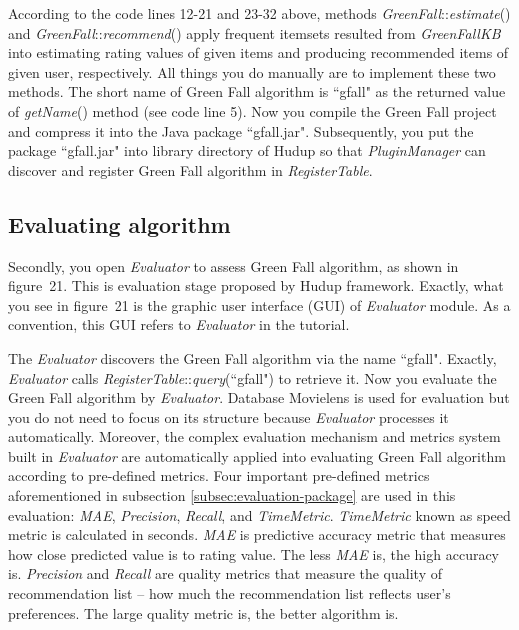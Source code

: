 \documentclass[a4paper]{llncs}
\begin{document}
According to the code lines 12-21 and 23-32 above, methods \textit{GreenFall}::\textit{estimate}() and \textit{GreenFall}::\textit{recommend}() apply frequent itemsets resulted from \textit{GreenFallKB} into estimating rating values of given items and producing recommended items of given user, respectively. All things you do manually are to implement these two methods. The short name of Green Fall algorithm is ``gfall" as the returned value of \textit{getName}() method (see code line 5). Now you compile the Green Fall project and compress it into the Java package ``gfall.jar". Subsequently, you put the package ``gfall.jar" into library directory of Hudup so that \textit{PluginManager} can discover and register Green Fall algorithm in \textit{RegisterTable}.

\subsection{Evaluating algorithm}
\label{subsec:tutorial-evaluating}
Secondly, you open \textit{Evaluator} to assess Green Fall algorithm, as shown in figure~21. This is evaluation stage proposed by Hudup framework. Exactly, what you see in figure~21 is the graphic user interface (GUI) of \textit{Evaluator} module. As a convention, this GUI refers to \textit{Evaluator} in the tutorial.

The \textit{Evaluator} discovers the Green Fall algorithm via the name ``gfall". Exactly, \textit{Evaluator} calls \textit{RegisterTable}::\textit{query}(``gfall") to retrieve it. Now you evaluate the Green Fall algorithm by \textit{Evaluator}. Database Movielens \cite{movielens} is used for evaluation but you do not need to focus on its structure because \textit{Evaluator} processes it automatically. Moreover, the complex evaluation mechanism and metrics system built in \textit{Evaluator} are automatically applied into evaluating Green Fall algorithm according to pre-defined metrics. Four important pre-defined metrics aforementioned in subsection \ref{subsec:evaluation-package} are used in this evaluation: \textit{MAE}, \textit{Precision}, \textit{Recall}, and \textit{TimeMetric}. \textit{TimeMetric} known as speed metric is calculated in seconds. \textit{MAE} is predictive accuracy metric that measures how close predicted value is to rating value. The less \textit{MAE} is, the high accuracy is. \textit{Precision} and \textit{Recall} are quality metrics that measure the quality of recommendation list – how much the recommendation list reflects user's preferences. The large quality metric is, the better algorithm is.
\end{document}
